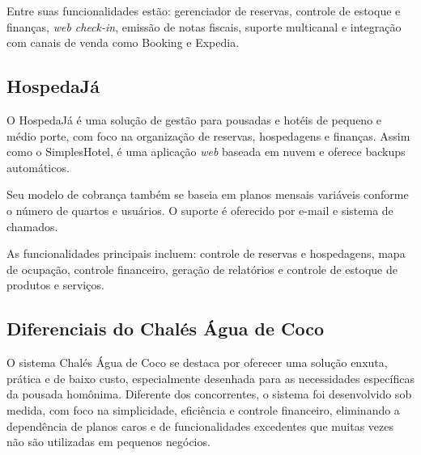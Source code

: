 \documentclass[
	12pt,				%
	openany,			%
	oneside,			%
	a4paper,			%
	english,			%
	french,				%
	spanish,			%
	brazil				%
	]{abntex2}
\begin{document}
Entre suas funcionalidades estão: gerenciador de reservas, controle de estoque e finanças, \textit{web check-in}, emissão de notas fiscais, suporte multicanal e integração com canais de venda como Booking e Expedia.

\subsection{HospedaJá}
O HospedaJá é uma solução de gestão para pousadas e hotéis de pequeno e médio porte, com foco na organização de reservas, hospedagens e finanças. Assim como o SimplesHotel, é uma aplicação \textit{web} baseada em nuvem e oferece backups automáticos.

Seu modelo de cobrança também se baseia em planos mensais variáveis conforme o número de quartos e usuários. O suporte é oferecido por e-mail e sistema de chamados.

As funcionalidades principais incluem: controle de reservas e hospedagens, mapa de ocupação, controle financeiro, geração de relatórios e controle de estoque de produtos e serviços.

\subsection{Diferenciais do Chalés Água de Coco}
O sistema Chalés Água de Coco se destaca por oferecer uma solução enxuta, prática e de baixo custo, especialmente desenhada para as necessidades específicas da pousada homônima. Diferente dos concorrentes, o sistema foi desenvolvido sob medida, com foco na simplicidade, eficiência e controle financeiro, eliminando a dependência de planos caros e de funcionalidades excedentes que muitas vezes não são utilizadas em pequenos negócios.
\end{document}
